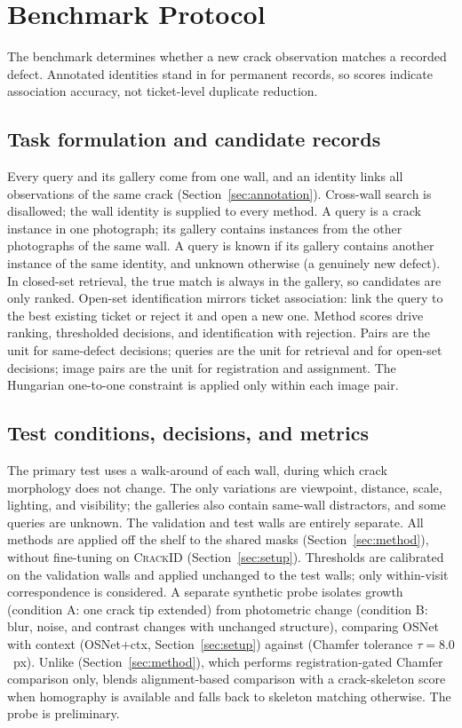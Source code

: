 \section{Benchmark Protocol}
\label{sec:protocol}

The benchmark determines whether a new crack observation matches a recorded defect. Annotated identities stand in for permanent records, so scores indicate association accuracy, not ticket-level duplicate reduction.

\subsection{Task formulation and candidate records}

Every query and its gallery come from one wall, and an identity links all observations of the same crack (Section~\ref{sec:annotation}). Cross-wall search is disallowed; the wall identity is supplied to every method.
A query is a crack instance in one photograph; its gallery contains instances from the other photographs of the same wall.
A query is known if its gallery contains another instance of the same identity, and unknown otherwise (a genuinely new defect).
In closed-set retrieval, the true match is always in the gallery, so candidates are only ranked.
Open-set identification mirrors ticket association: link the query to the best existing ticket or reject it and open a new one.
Method scores drive ranking, thresholded decisions, and identification with rejection.
Pairs are the unit for same-defect decisions; queries are the unit for retrieval and for open-set decisions; image pairs are the unit for registration and assignment.
The Hungarian one-to-one constraint is applied only within each image pair.

\subsection{Test conditions, decisions, and metrics}

The primary test uses a walk-around of each wall, during which crack morphology does not change. The only variations are viewpoint, distance, scale, lighting, and visibility; the galleries also contain same-wall distractors, and some queries are unknown.
The validation and test walls are entirely separate.
All methods are applied off the shelf to the shared masks (Section~\ref{sec:method}), without fine-tuning on \textsc{CrackID} (Section~\ref{sec:setup}).
Thresholds are calibrated on the validation walls and applied unchanged to the test walls; only within-visit correspondence is considered.
A separate synthetic probe isolates growth (condition A: one crack tip extended) from photometric change (condition B: blur, noise, and contrast changes with unchanged structure), comparing OSNet with context (OSNet+ctx, Section~\ref{sec:setup}) against \hybrid{} (Chamfer tolerance $\tau=8.0$~px). Unlike \ours{} (Section~\ref{sec:method}), which performs registration-gated Chamfer comparison only, \hybrid{} blends alignment-based comparison with a crack-skeleton score when homography is available and falls back to skeleton matching otherwise. The probe is preliminary.

